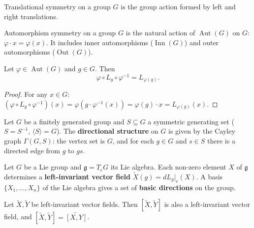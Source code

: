 \begin{definition}\label{def:group_translation_symmetry}
Translational symmetry on a group $G$ is the group action formed by left and right translations.
\end{definition}

\begin{definition}\label{def:group_automorphism_symmetry}
Automorphism symmetry on a group $G$ is the natural action of $\operatorname{Aut}(G)$ on $G$: $\varphi \cdot x = \varphi(x)$. It includes inner automorphisms ($\operatorname{Inn}(G)$) and outer automorphisms ($\operatorname{Out}(G)$).
\end{definition}

\begin{proposition}\label{prop:translation_automorphism_compatibility}
Let $\varphi \in \operatorname{Aut}(G)$ and $g \in G$. Then
\[
\varphi \circ L_g \circ \varphi^{-1} = L_{\varphi(g)}.
\]
\end{proposition}

\begin{proof}
For any $x \in G$: $(\varphi \circ L_g \circ \varphi^{-1})(x) = \varphi(g \cdot \varphi^{-1}(x)) = \varphi(g) \cdot x = L_{\varphi(g)}(x)$.
\end{proof}

\begin{definition}\label{def:discrete_group_direction}
Let $G$ be a finitely generated group and $S \subseteq G$ a symmetric generating set ($S = S^{-1}$, $\langle S \rangle = G$). The \textbf{directional structure} on $G$ is given by the Cayley graph $\Gamma(G,S)$: the vertex set is $G$, and for each $g \in G$ and $s \in S$ there is a directed edge from $g$ to $gs$.
\end{definition}

\begin{definition}\label{def:lie_group_direction}
Let $G$ be a Lie group and $\mathfrak{g} = T_e G$ its Lie algebra. Each non-zero element $X$ of $\mathfrak{g}$ determines a \textbf{left-invariant vector field} $\tilde{X}(g) = dL_g|_e(X)$. A basis $\{X_1, \dots, X_n\}$ of the Lie algebra gives a set of \textbf{basic directions} on the group.
\end{definition}

\begin{proposition}\label{prop:left_invariant_fields}
Let $\tilde{X}, \tilde{Y}$ be left-invariant vector fields. Then $[\tilde{X}, \tilde{Y}]$ is also a left-invariant vector field, and $[\tilde{X}, \tilde{Y}] = \widetilde{[X,Y]}$.
\end{proposition}

